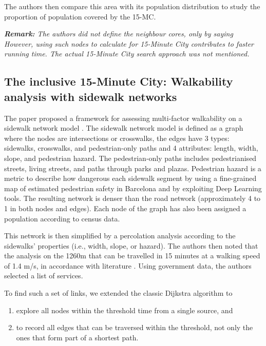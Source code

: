 The authors then compare this area with its population distribution to study the proportion of population covered by the 15-MC.

\textit{\textbf{Remark:} The authors did not define the neighbour cores, only by saying  However, using such nodes to calculate for 15-Minute City contributes to faster running time. The actual 15-Minute City search approach was not mentioned.}

\subsection{The inclusive 15-Minute City: Walkability analysis with sidewalk networks} \label{rhoads_inclusive_2023}

The paper proposed a framework for assessing multi-factor walkability on a sidewalk network model \cite{rhoads_inclusive_2023}. The sidewalk network model is defined as a graph where the nodes are intersections or crosswalks, the edges have 3 types: sidewalks, crosswalks, and pedestrian-only paths and 4 attributes: length, width, slope, and pedestrian hazard. The pedestrian-only paths includes pedestrianised streets, living streets, and paths through parks and plazas. Pedestrian hazard is a metric to describe how dangerous each sidewalk segment by using a fine-grained map of estimated pedestrian safety in Barcelona \cite{bustos_explainable_2021} and by exploiting Deep Learning tools. The resulting network is denser than the road network (approximately 4 to 1 in both nodes and edges). Each node of the graph has also been assigned a population according to census data.

This network is then simplified by a percolation analysis according to the sidewalks' properties (i.e., width, slope, or hazard). The authors then noted that the analysis on the 1260m that can be travelled in 15 minutes at a walking speed of 1.4 m/s, in accordance with literature \cite{bosina_estimating_2017}. Using government data, the authors selected a list of services.

To find such a set of links, we extended the classic Dijkstra algorithm to

\begin{enumerate}
\item explore all nodes within the threshold time from a single source, and
\item to record all edges that can be traversed within the threshold, not only the ones that form part of a shortest path.
\end{enumerate}

